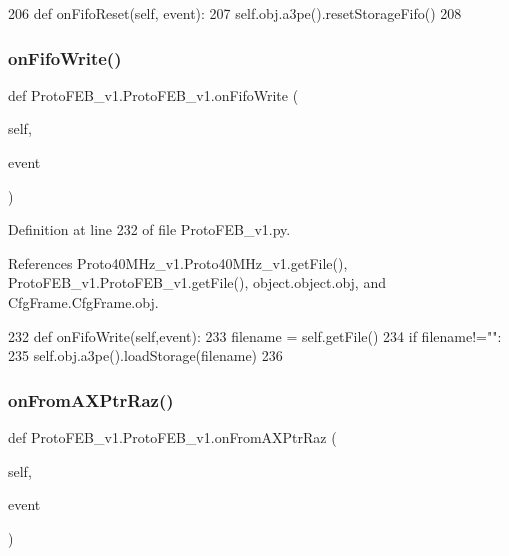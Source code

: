 \begin{DoxyCode}
206     \textcolor{keyword}{def }onFifoReset(self, event):
207         self.obj.a3pe().resetStorageFifo()
208 
\end{DoxyCode}
\mbox{\label{classProtoFEB__v1_1_1ProtoFEB__v1_a1ba3f8146393f309ab8c3b88fb9c1c6e}} 
\subsubsection{\texorpdfstring{on\+Fifo\+Write()}{onFifoWrite()}}
{\footnotesize\ttfamily def Proto\+F\+E\+B\+\_\+v1.\+Proto\+F\+E\+B\+\_\+v1.\+on\+Fifo\+Write (\begin{DoxyParamCaption}\item[{}]{self,  }\item[{}]{event }\end{DoxyParamCaption})}



Definition at line 232 of file Proto\+F\+E\+B\+\_\+v1.\+py.



References Proto40\+M\+Hz\+\_\+v1.\+Proto40\+M\+Hz\+\_\+v1.\+get\+File(), Proto\+F\+E\+B\+\_\+v1.\+Proto\+F\+E\+B\+\_\+v1.\+get\+File(), object.\+object.\+obj, and Cfg\+Frame.\+Cfg\+Frame.\+obj.


\begin{DoxyCode}
232     \textcolor{keyword}{def }onFifoWrite(self,event):
233         filename = self.getFile()
234         \textcolor{keywordflow}{if} filename!=\textcolor{stringliteral}{""}:
235             self.obj.a3pe().loadStorage(filename)
236 
\end{DoxyCode}
\mbox{\label{classProtoFEB__v1_1_1ProtoFEB__v1_a737330f2c73fda78aed98f9ce652ec45}} 
\subsubsection{\texorpdfstring{on\+From\+A\+X\+Ptr\+Raz()}{onFromAXPtrRaz()}}
{\footnotesize\ttfamily def Proto\+F\+E\+B\+\_\+v1.\+Proto\+F\+E\+B\+\_\+v1.\+on\+From\+A\+X\+Ptr\+Raz (\begin{DoxyParamCaption}\item[{}]{self,  }\item[{}]{event }\end{DoxyParamCaption})}



